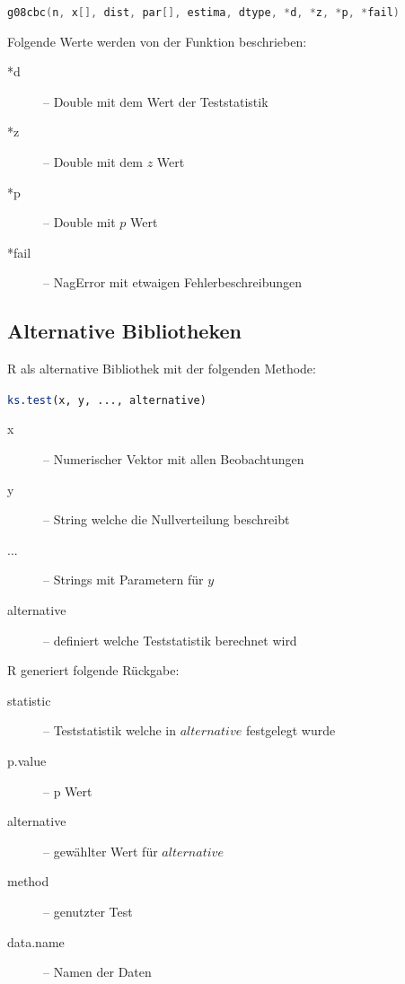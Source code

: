 \documentclass{beamer}
\begin{document}
\begin{frame}[fragile]{\insertsubsection}
\begin{center}\lstinline[language=C++]$g08cbc(n, x[], dist, par[], estima, dtype, *d, *z, *p, *fail)$\end{center}
Folgende Werte werden von der Funktion beschrieben:
	\begin{description}
		\item[*d] -- Double mit dem Wert der Teststatistik
		\item[*z] -- Double mit dem $z$ Wert
		\item[*p] -- Double mit $p$ Wert
		\item[*fail] -- NagError mit etwaigen Fehlerbeschreibungen
	\end{description}
\end{frame}

\subsection{Alternative Bibliotheken}
\begin{frame}{\insertsubsection}
R als alternative Bibliothek mit der folgenden Methode: 
\begin{center}\lstinline[language=R] $ks.test(x, y, ..., alternative)$\end{center}
\begin{description}
\item[x] -- Numerischer Vektor mit  allen Beobachtungen
\item[y] -- String welche die Nullverteilung beschreibt
\item[...]-- Strings mit Parametern für $y$
\item[alternative]-- definiert welche Teststatistik berechnet wird
\end{description}
R generiert folgende Rückgabe:
\begin{description}
\item[statistic] -- Teststatistik welche in $alternative$ festgelegt wurde
\item[p.value] -- p Wert
\item[alternative] -- gewählter Wert für $alternative$
\item[method] -- genutzter Test
\item[data.name] -- Namen der Daten
\end{description}

\end{frame}
\end{document}
